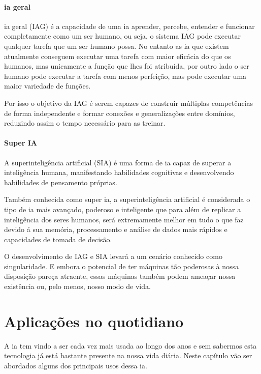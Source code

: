 \documentclass{report}
\begin{document}
\subsubsection{\ac{ia} geral}
\ac{ia} geral (IAG) é a capacidade de uma \ac{ia} aprender, percebe, entender e funcionar completamente como um ser humano, ou seja, o sistema IAG pode executar qualquer tarefa que um ser humano possa. No entanto as \ac{ia} que existem atualmente conseguem executar uma tarefa com maior eficácia do que os humanos, mas unicamente a função que lhes foi atribuída, por outro lado o ser humano pode executar a tarefa com menos perfeição, mas pode executar uma maior variedade de funções.

Por isso o objetivo da IAG é serem capazes de construir múltiplas competências de forma independente e formar conexões e generalizações entre domínios, reduzindo assim o tempo necessário para as treinar.

\subsubsection{Super IA}
A superinteligência artificial (SIA) é uma forma de \ac{ia} capaz de superar a inteligência humana, manifestando habilidades cognitivas e desenvolvendo habilidades de pensamento próprias.

Também conhecida como super \ac{ia}, a superinteligência artificial é considerada o tipo de \ac{ia} mais avançado, poderoso e inteligente que para além de replicar a inteligência dos seres humanos, será extremamente melhor em tudo o que faz devido á sua memória, processamento e análise de dados mais rápidos e capacidades de tomada de decisão.

O desenvolvimento de IAG e SIA levará a um cenário conhecido como singularidade. E embora o potencial de ter máquinas tão poderosas à nossa disposição pareça atraente, essas máquinas também podem ameaçar nossa existência ou, pelo menos, nosso modo de vida.

\chapter{Aplicações no quotidiano}
\label{chap.quotidiano}
A \ac{ia} tem vindo a ser cada vez mais usada ao longo dos anos e sem sabermos esta tecnologia já está bastante presente na nossa vida diária. Neste capítulo vão ser abordados alguns dos principais usos dessa \ac{ia}.
\end{document}
